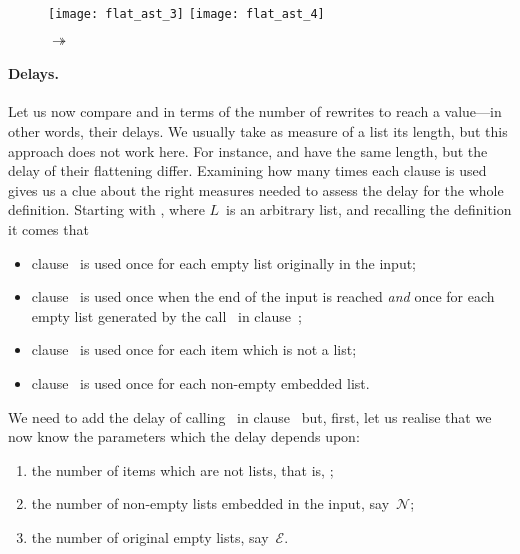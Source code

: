 \begin{figure}[t]
\centering
\texttt{[image: flat\_ast\_3]}
\texttt{[image: flat\_ast\_4]}
\caption{ \(\twoheadrightarrow\)
  \erlcode{[a,b,c]} \label{fig:flat_ast2}}
\end{figure}

\medskip

\paragraph{Delays.}

Let us now compare  and  in terms of
the number of rewrites to reach a value---in other words, their
delays. We usually take as measure of a list its length, but this
approach does not work here. For instance, \erlcode{[[1,w],6]} and
\erlcode{[a,b]} have the same length, but the delay of their
flattening differ. Examining how many times each clause is used gives
us a clue about the right measures needed to assess the delay for the
whole definition. Starting with , where \(L\)~is
an arbitrary list, and recalling the definition
  it comes
that
\begin{itemize}

  \item clause~\clause{\beta} is used once for each empty list
    originally in the input;

  \item clause~\clause{\alpha} is used once when the end of the input
    is reached \emph{and} once for each empty list generated by the
    call~ in clause~\clause{\gamma};

  \item clause~\clause{\delta} is used once for each item which is not
    a list;

  \item clause~\clause{\gamma} is used once for each non\hyp{}empty
    embedded list.

\end{itemize}
We need to add the delay of calling~ in
clause~\clause{\gamma} but, first, let us realise that we now know the
parameters which the delay depends upon:
\begin{enumerate}

  \item the number of items which are not lists, that is,
    ;

  \item the number of non\hyp{}empty lists embedded in the input,
    say~\(\mathcal{N}\);

  \item the number of original empty lists, say~\(\mathcal{E}\).

\end{enumerate}
